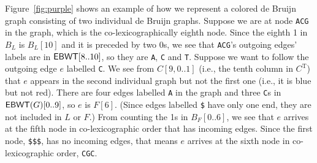 Figure~\ref{fig:purple} shows an example of how we represent a colored de Bruijn graph consisting of two individual de Bruijn graphs.  Suppose we are at node {\tt ACG} in the graph, which is the co-lexicographically eighth node.  Since the eighth 1 in $B_L$ is \(B_L [10]\) and it is preceded by two 0s, we see that {\tt ACG}'s outgoing edges' labels are in \(\mathsf{EBWT} [8..10]\), so they are {\tt A}, {\tt C} and {\tt T}.  Suppose we want to follow the outgoing edge $e$ labelled {\tt C}.  We see from \(C [9, 0..1]\) (i.e., the tenth column in $C^\mathrm{T}$) that $e$ appears in the second individual graph but not the first one (i.e., it is blue but not red).    There are four edges labelled {\tt A} in the graph and three {\tt C}s in \(\mathsf{EBWT} (G) [0..9]\), so $e$ is \(F [6]\).  (Since edges labelled {\tt \$} have only one end, they are not included in $L$ or $F$.)  From counting the 1s in \(B_F [0..6]\), we see that $e$ arrives at the fifth node in co-lexicographic order that has incoming edges.  Since the first node, {\tt \$\$\$}, has no incoming edges, that means $e$ arrives at the sixth node in co-lexicographic order, {\tt CGC}.

